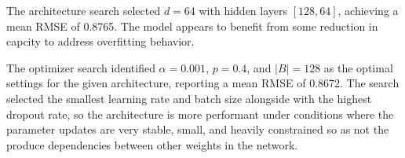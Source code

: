 The architecture search selected $d = 64$ with hidden layers $[128, 64]$, achieving a mean RMSE of 0.8765. The model appears to benefit 
from some reduction in capcity to address overfitting behavior.

The optimizer search identified $\alpha = 0.001$, $p = 0.4$, and $ |B| = 128 $ as the optimal settings for the given architecture,
reporting a mean RMSE of 0.8672. The search selected the smallest learning rate and batch size alongside with the highest dropout rate,
so the architecture is more performant under conditions where the parameter updates are very stable, small, and heavily constrained so 
as not the produce dependencies between other weights in the network.
